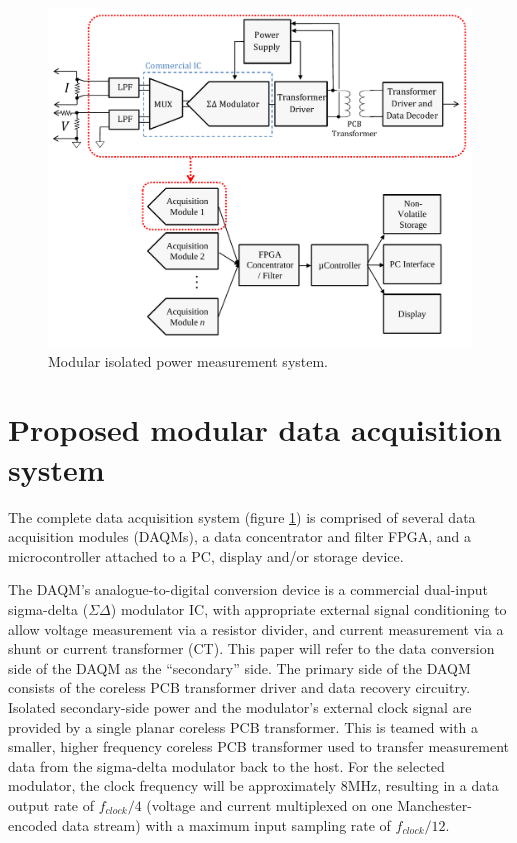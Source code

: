 \documentclass[conference]{IEEEtran}
\begin{document}
\begin{figure}[t]
	\centering
	\includegraphics[width=1.0\columnwidth]{./img/FullSystem_BasicCol}
	\caption{Modular isolated power measurement system.}
	\label{fig:FullSystem}
\end{figure}

\section{Proposed modular data acquisition system}
The complete data acquisition system (figure \ref{fig:FullSystem}) is comprised of several data acquisition modules (DAQMs), a data concentrator and filter FPGA, and a microcontroller attached to a PC, display and/or storage device.

The DAQM's analogue-to-digital conversion device is a commercial dual-input sigma-delta ($\Sigma\Delta$) modulator IC, with appropriate external signal conditioning to allow voltage measurement via a resistor divider, and current measurement via a shunt or current transformer (CT).  This paper will refer to the data conversion side of the DAQM as the ``secondary'' side.  The primary side of the DAQM consists of the coreless PCB transformer driver and data recovery circuitry.  Isolated secondary-side power and the modulator's external clock signal are provided by a single planar coreless PCB transformer.  This is teamed with a smaller,  higher frequency coreless PCB transformer used to transfer measurement data from the sigma-delta modulator back to the host.  For the selected modulator, the clock frequency will be approximately 8MHz, resulting in a data output rate of $ f_{clock}/4 $ (voltage and current multiplexed on one Manchester-encoded data stream) with a maximum input sampling rate of $ f_{clock}/12 $.
\end{document}
